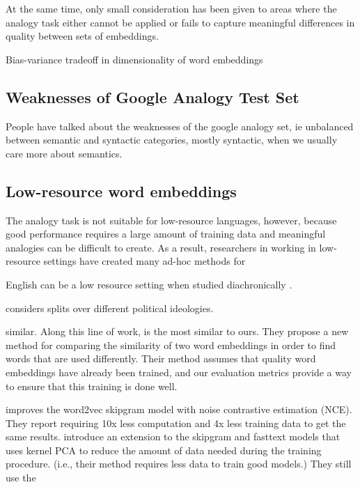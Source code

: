 \documentclass[11pt,a4paper]{article}
\begin{document}
At the same time, only small consideration has been given to areas where the analogy task either cannot be applied or fails to capture meaningful differences in quality between sets of embeddings.

Bias-variance tradeoff in dimensionality of word embeddings \cite{yin2018dimensionality}

\subsection{Weaknesses of Google Analogy Test Set}

People have talked about the weaknesses of the google analogy set, ie unbalanced between semantic and syntactic categories, mostly syntactic, when we usually care more about semantics.
\cite{}

\subsection{Low-resource word embeddings}

The analogy task is not suitable for low-resource languages,
however, because good performance requires a large amount of training data and meaningful analogies can be difficult to create.
As a result, researchers in working in low-resource settings have created many ad-hoc methods for 

English can be a low resource setting when studied diachronically \cite[e.g.][]{hamilton2016diachronic,hamilton2016cultural,kutuzov2018diachronic,kozlowski2019geometry,dubossarsky2017outta,tang2018state,szymanski2017temporal,liang2018dynamic,chen2017understanding}.

\citet{azarbonyad2017words} considers splits over different political ideologies.

\cite{kulkarni2015statistically} similar.
Along this line of work, \citet{gonen2020simple} is the most similar to ours.
They propose a new method for comparing the similarity of two word embeddings in order to find words that are used differently.
Their method assumes that quality word embeddings have already been trained,
and our evaluation metrics provide a way to ensure that this training is done well.

\citet{NIPS2013_5165} improves the word2vec skipgram model with noise contrastive estimation (NCE).
They report requiring 10x less computation and 4x less training data to get the same results.
\citet{gupta-etal-2019-improving} introduce an extension to the skipgram and fasttext models that uses kernel PCA to reduce the amount of data needed during the training procedure.
(i.e., their method requires less data to train good models.)
They still use the
\end{document}
